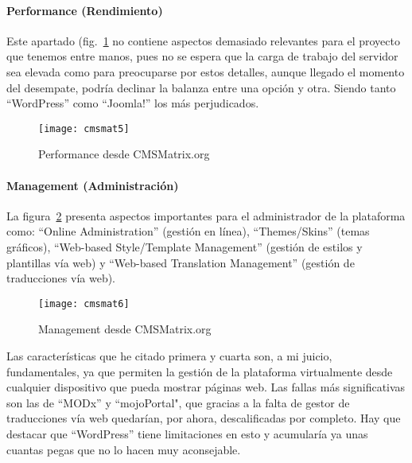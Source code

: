 \paragraph{Performance (Rendimiento)}

\par Este apartado (fig.~\ref{fig:cmsmat5} no contiene aspectos demasiado relevantes para el proyecto que tenemos entre manos, pues no se espera que la carga de trabajo del servidor sea elevada como para preocuparse por estos detalles, aunque llegado el momento del desempate, podría declinar la balanza entre una opción y otra. Siendo tanto ``WordPress'' como ``Joomla!'' los más perjudicados.

\begin{figure}
\begin{narrow}{-0.12\linewidth}{-0.12\linewidth}
\centering
\texttt{[image: cmsmat5]}
\caption{Performance desde CMSMatrix.org}
\label{fig:cmsmat5}
\end{narrow}
\end{figure}


\paragraph{Management (Administración)}

\par La figura~\ref{fig:cmsmat6} presenta aspectos importantes para el administrador de la plataforma como: ``Online Administration'' (gestión en línea), ``Themes/Skins'' (temas gráficos), ``Web-based Style/Template Management'' (gestión de estilos y plantillas vía web) y ``Web-based Translation Management'' (gestión de traducciones vía web).

\begin{figure}
\begin{narrow}{-0.12\linewidth}{-0.12\linewidth}
\centering
\texttt{[image: cmsmat6]}
\caption{Management desde CMSMatrix.org}
\label{fig:cmsmat6}
\end{narrow}
\end{figure}

\par Las características que he citado primera y cuarta son, a mi juicio, fundamentales, ya que permiten la gestión de la plataforma virtualmente desde cualquier dispositivo que pueda mostrar páginas web. Las fallas más significativas son las de ``MODx'' y ``mojoPortal", que gracias a la falta de gestor de traducciones vía web quedarían, por ahora, descalificadas por completo. Hay que destacar que ``WordPress'' tiene limitaciones en esto y acumularía ya unas cuantas pegas que no lo hacen muy aconsejable.


